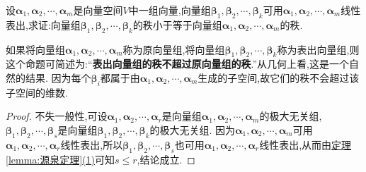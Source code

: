 \documentclass[../../main.tex]{subfiles}%
\begin{document}
\begin{proposition}\label{proposition:表出向量组的秩不超过原向量组的秩}
设\(\boldsymbol{\alpha}_1,\boldsymbol{\alpha}_2,\cdots,\boldsymbol{\alpha}_m\)是向量空间\(V\)中一组向量,向量组\(\boldsymbol{\beta}_1,\boldsymbol{\beta}_2,\cdots,\boldsymbol{\beta}_k\)可用\(\boldsymbol{\alpha}_1,\boldsymbol{\alpha}_2,\cdots,\boldsymbol{\alpha}_m\)线性表出,求证:向量组\(\boldsymbol{\beta}_1,\boldsymbol{\beta}_2,\cdots,\boldsymbol{\beta}_k\)的秩小于等于向量组\(\boldsymbol{\alpha}_1,\boldsymbol{\alpha}_2,\cdots,\boldsymbol{\alpha}_m\)的秩.
\end{proposition}
\begin{remark}
如果将向量组\(\boldsymbol{\alpha}_1,\boldsymbol{\alpha}_2,\cdots,\boldsymbol{\alpha}_m\)称为原向量组,将向量组\(\boldsymbol{\beta}_1,\boldsymbol{\beta}_2,\cdots,\boldsymbol{\beta}_k\)称为表出向量组,则这个命题可简述为:“\textbf{表出向量组的秩不超过原向量组的秩}.”从几何上看,这是一个自然的结果. 因为每个\(\boldsymbol{\beta}_i\)都属于由\(\boldsymbol{\alpha}_1,\boldsymbol{\alpha}_2,\cdots,\boldsymbol{\alpha}_m\)生成的子空间,故它们的秩不会超过该子空间的维数.
\end{remark}
\begin{proof}
不失一般性,可设\(\boldsymbol{\alpha}_1,\boldsymbol{\alpha}_2,\cdots,\boldsymbol{\alpha}_r\)是向量组\(\boldsymbol{\alpha}_1,\boldsymbol{\alpha}_2,\cdots,\boldsymbol{\alpha}_m\)的极大无关组,\(\boldsymbol{\beta}_1,\boldsymbol{\beta}_2,\cdots,\boldsymbol{\beta}_s\)是向量组\(\boldsymbol{\beta}_1,\boldsymbol{\beta}_2,\cdots,\boldsymbol{\beta}_k\)的极大无关组. 因为\(\boldsymbol{\alpha}_1,\boldsymbol{\alpha}_2,\cdots,\boldsymbol{\alpha}_m\)可用\(\boldsymbol{\alpha}_1,\boldsymbol{\alpha}_2,\cdots,\boldsymbol{\alpha}_r\)线性表出,所以\(\boldsymbol{\beta}_1,\boldsymbol{\beta}_2,\cdots,\boldsymbol{\beta}_s\)也可用\(\boldsymbol{\alpha}_1,\boldsymbol{\alpha}_2,\cdots,\boldsymbol{\alpha}_r\)线性表出,从而由\hyperref[lemma:源泉定理]{定理\ref{lemma:源泉定理}(1)}可知\(s\leqslant  r\),结论成立.
\end{proof}
\end{document}
